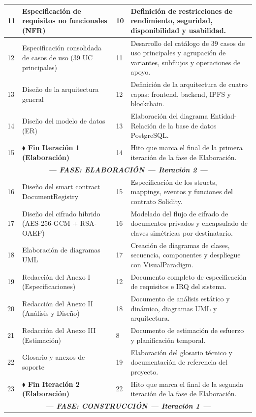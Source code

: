\documentclass[11pt, a4paper]{article}
\begin{document}
\begin{longtable}{|p{1cm}|p{5.5cm}|p{1.5cm}|p{5.5cm}|}
\hline
11 & Especificación de requisitos no funcionales (NFR) & 10 & Definición de restricciones de rendimiento, seguridad, disponibilidad y usabilidad. \\
\hline
12 & Especificación consolidada de casos de uso (39 UC principales) & 11 & Desarrollo del catálogo de 39 casos de uso principales y agrupación de variantes, subflujos y operaciones de apoyo. \\
\hline
13 & Diseño de la arquitectura general & 12 & Definición de la arquitectura de cuatro capas: frontend, backend, IPFS y blockchain. \\
\hline
14 & Diseño del modelo de datos (ER) & 13 & Elaboración del diagrama Entidad-Relación de la base de datos PostgreSQL. \\
\hline
15 & \textbf{$\blacklozenge$ Fin Iteración 1 (Elaboración)} & 14 & Hito que marca el final de la primera iteración de la fase de Elaboración. \\
\hline
\multicolumn{4}{|c|}{\textit{\textbf{--- FASE: ELABORACIÓN --- Iteración 2 ---}}} \\
\hline
16 & Diseño del smart contract DocumentRegistry & 15 & Especificación de los structs, mappings, eventos y funciones del contrato Solidity. \\
\hline
17 & Diseño del cifrado híbrido (AES-256-GCM + RSA-OAEP) & 16 & Modelado del flujo de cifrado de documentos privados y encapsulado de claves simétricas por destinatario. \\
\hline
18 & Elaboración de diagramas UML & 17 & Creación de diagramas de clases, secuencia, componentes y despliegue con VisualParadigm. \\
\hline
19 & Redacción del Anexo I (Especificaciones) & 12 & Documento completo de especificación de requisitos e IRQ del sistema. \\
\hline
20 & Redacción del Anexo II (Análisis y Diseño) & 18 & Documento de análisis estático y dinámico, diagramas UML y arquitectura. \\
\hline
21 & Redacción del Anexo III (Estimación) & 8 & Documento de estimación de esfuerzo y planificación temporal. \\
\hline
22 & Glosario y anexos de soporte & 19 & Elaboración del glosario técnico y documentación de referencia del proyecto. \\
\hline
23 & \textbf{$\blacklozenge$ Fin Iteración 2 (Elaboración)} & 22 & Hito que marca el final de la segunda iteración de la fase de Elaboración. \\
\hline
\multicolumn{4}{|c|}{\textit{\textbf{--- FASE: CONSTRUCCIÓN --- Iteración 1 ---}}} \\

\end{longtable}
\end{document}
